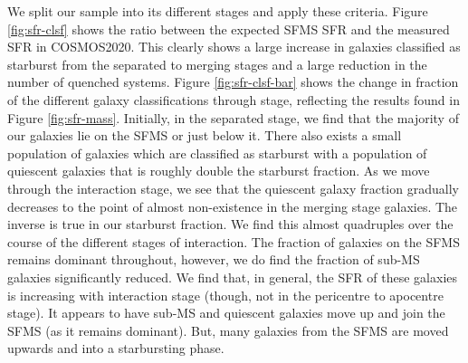 \noindent We split our sample into its different stages and apply these criteria. Figure \ref{fig:sfr-clsf} shows the ratio between the expected SFMS SFR and the measured SFR in COSMOS2020. This clearly shows a large increase in galaxies classified as starburst from the separated to merging stages and a large reduction in the number of quenched systems. Figure \ref{fig:sfr-clsf-bar} shows the change in fraction of the different galaxy classifications through stage, reflecting the results found in Figure \ref{fig:sfr-mass}. Initially, in the separated stage, we find that the majority of our galaxies lie on the SFMS or just below it. There also exists a small population of galaxies which are classified as starburst with a population of quiescent galaxies that is roughly double the starburst fraction. As we move through the interaction stage, we see that the quiescent galaxy fraction gradually decreases to the point of almost non-existence in the merging stage galaxies. The inverse is true in our starburst fraction. We find this almost quadruples over the course of the different stages of interaction. The fraction of galaxies on the SFMS remains dominant throughout, however, we do find the fraction of sub-MS galaxies significantly reduced. We find that, in general, the SFR of these galaxies is increasing with interaction stage (though, not in the pericentre to apocentre stage). It appears to have sub-MS and quiescent galaxies move up and join the SFMS (as it remains dominant). But, many galaxies from the SFMS are moved upwards and into a starbursting phase.

